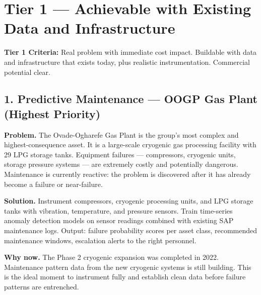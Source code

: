 \documentclass[10pt]{article}
\newcommand{\bigspacer}{\vspace{16pt}}
\begin{document}
\bigspacer

\section{Tier 1 --- Achievable with Existing Data and Infrastructure}

\noindent\colorbox{tier1!8}{%
\begin{minipage}{\dimexpr\textwidth-2\fboxsep}
  \vspace{4pt}
  {\small\color{tier1}\textbf{Tier 1 Criteria:} Real problem with immediate cost
  impact. Buildable with data and infrastructure that exists today, plus
  realistic instrumentation. Commercial potential clear.}
  \vspace{4pt}
\end{minipage}}

\bigspacer

\subsection*{1. Predictive Maintenance --- OOGP Gas Plant (Highest Priority)}

\textbf{Problem.}
The Ovade-Ogharefe Gas Plant is the group's most complex and highest-consequence
asset. It is a large-scale cryogenic gas processing facility with 29 LPG storage
tanks. Equipment failures --- compressors, cryogenic units, storage pressure
systems --- are extremely costly and potentially dangerous. Maintenance is
currently reactive: the problem is discovered after it has already become a
failure or near-failure.

\textbf{Solution.}
Instrument compressors, cryogenic processing units, and LPG storage tanks
with vibration, temperature, and pressure sensors. Train time-series anomaly
detection models on sensor readings combined with existing SAP maintenance
logs. Output: failure probability scores per asset class, recommended
maintenance windows, escalation alerts to the right personnel.

\textbf{Why now.}
The Phase 2 cryogenic expansion was completed in 2022. Maintenance pattern
data from the new cryogenic systems is still building. This is the ideal
moment to instrument fully and establish clean data before failure patterns
are entrenched.
\end{document}
